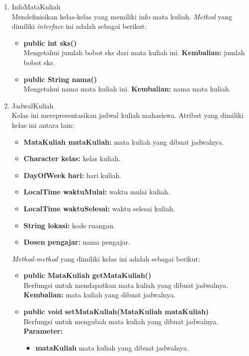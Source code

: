 \begin{enumerate}
\begin{enumerate}
		\item InfoMataKuliah\\
		Mendefinisikan kelas-kelas yang memiliki info mata kuliah. \textit{Method} yang dimiliki \textit{interface} ini adalah sebagai berikut:
		\begin{itemize}
			\item \textbf{public int sks()}\\
			Mengetahui jumlah bobot sks dari mata kuliah ini.
			\textbf{Kembalian:} jumlah bobot sks.
			\item \textbf{public String nama()}\\
			Mengetahui nama mata kuliah ini.
			\textbf{Kembalian:} nama mata kuliah.
		\end{itemize}
		
		\item JadwalKuliah\\
		Kelas ini merepresentasikan jadwal kuliah mahasiswa. Atribut yang dimiliki kelas ini antara lain:
		\begin{itemize}
			\item \textbf{MataKuliah mataKuliah:} mata kuliah yang dibuat jadwalnya.
			\item \textbf{Character kelas:} kelas kuliah.
			\item \textbf{DayOfWeek hari:} hari kuliah.
			\item \textbf{LocalTime waktuMulai:} waktu mulai kuliah.
			\item \textbf{LocalTime waktuSelesai:} waktu selesai kuliah.
			\item \textbf{String lokasi:} kode ruangan.
			\item \textbf{Dosen pengajar:} nama pengajar.
		\end{itemize}
	\textit{Method-method} yang dimiliki kelas ini adalah sebagai berikut:
		\begin{itemize}
			\item \textbf{public MataKuliah getMataKuliah()}\\
				Berfungsi untuk mendapatkan mata kuliah yang dibuat jadwalnya.\\
				\textbf{Kembalian:} mata kuliah yang dibuat jadwalnya.

			\item \textbf{public void setMataKuliah(MataKuliah mataKuliah)}\\
				Berfungsi untuk mengubah mata kuliah yang dibuat jadwalnya.\\
				\textbf{Parameter:}
				\begin{itemize}
					\item \textbf{mataKuliah} mata kuliah yang dibuat jadwalnya.
				\end{itemize}
				

\end{itemize}
\end{enumerate}
\end{enumerate}
